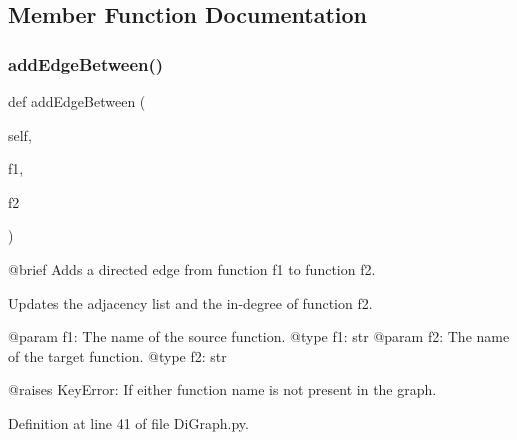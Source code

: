 \subsection{Member Function Documentation}
\mbox{\label{classDiGraph_1_1DiGraph_ab064bb6af6f4d1916413e2ab9ef9cdb4}} 
\subsubsection{\texorpdfstring{add\+Edge\+Between()}{addEdgeBetween()}}
{\footnotesize\ttfamily def add\+Edge\+Between (\begin{DoxyParamCaption}\item[{}]{self,  }\item[{}]{f1,  }\item[{}]{f2 }\end{DoxyParamCaption})}

\begin{DoxyVerb}@brief Adds a directed edge from function f1 to function f2.

Updates the adjacency list and the in-degree of function f2.

@param f1: The name of the source function.
@type f1: str
@param f2: The name of the target function.
@type f2: str

@raises KeyError: If either function name is not present in the graph.
\end{DoxyVerb}
 

Definition at line 41 of file Di\+Graph.\+py.


